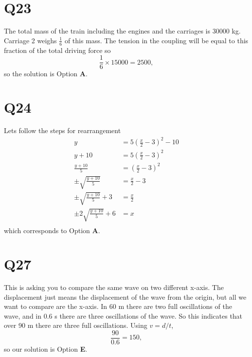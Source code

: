 \documentclass[11pt]{article}
\begin{document}
\section*{Q23}
The total mass of the train including the engines and the carriages is 30000 kg.  Carriage 2 weighs $\frac{1}{6}$ of this mass.  The tension in the coupling will be equal to this fraction of the total driving force so
\begin{equation*}
\frac{1}{6}\times 15000 = 2500,
\end{equation*}  
so the solution is Option \textbf{A}.

\section*{Q24}
Lets follow the steps for rearrangement
\begin{equation*}
\begin{aligned}
y &= 5\left(\frac{x}{2}-3\right)^2 - 10\\
y+10 &= 5\left(\frac{x}{2}-3\right)^2\\
\frac{y+10}{5} &= \left(\frac{x}{2}-3\right)^2\\
\pm\sqrt{\frac{y+10}{5}} &= \frac{x}{2}-3\\
\pm\sqrt{\frac{y+10}{5}}+3 &= \frac{x}{2}\\
\pm2\sqrt{\frac{y+10}{5}}+6 &= x\\
\end{aligned}
\end{equation*}
which corresponds to Option \textbf{A}.

\section*{Q27}
This is asking you to compare the same wave on two different x-axis.  The displacement just means the displacement of the wave from the origin, but all we want to compare are the x-axis.  In 60 m there are two full oscillations of the wave, and in 0.6 s there are three oscillations of the wave.  So this indicates that over 90 m there are three full oscillations.  Using $v=d/t$,
\begin{equation*}
\frac{90}{0.6} = 150,
\end{equation*}
so our solution is Option \textbf{E}.
\end{document}
